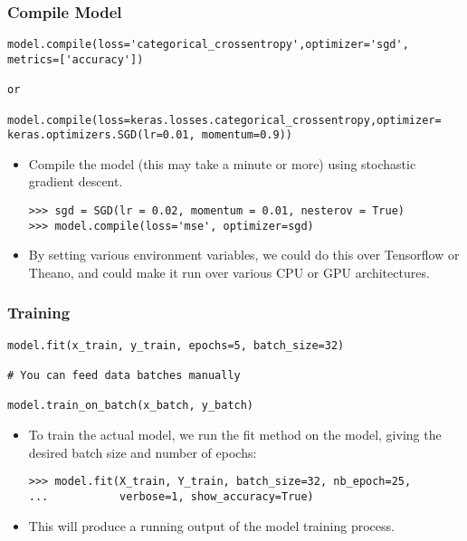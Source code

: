 \begin{frame}[fragile] \frametitle{Compile Model}
\begin{lstlisting}
model.compile(loss='categorical_crossentropy',optimizer='sgd',
metrics=['accuracy'])

or

model.compile(loss=keras.losses.categorical_crossentropy,optimizer=
keras.optimizers.SGD(lr=0.01, momentum=0.9))
\end{lstlisting}

\begin{itemize}
\item Compile the model (this may take a minute
or more) using stochastic gradient descent.
\begin{lstlisting}
>>> sgd = SGD(lr = 0.02, momentum = 0.01, nesterov = True)
>>> model.compile(loss='mse', optimizer=sgd)
\end{lstlisting}
\item By setting various environment variables, we could do this
over Tensorflow or Theano, and could make it run over
various CPU or GPU architectures.
\end{itemize}

\end{frame}

\begin{frame}[fragile] \frametitle{Training}
\begin{lstlisting}
model.fit(x_train, y_train, epochs=5, batch_size=32)

# You can feed data batches manually

model.train_on_batch(x_batch, y_batch)
\end{lstlisting}

\begin{itemize}
\item To train the actual model, we run the fit method on
the model, giving the desired batch size and number
of epochs:
\begin{lstlisting}
>>> model.fit(X_train, Y_train, batch_size=32, nb_epoch=25,
...           verbose=1, show_accuracy=True)
\end{lstlisting}
\item This will produce a running output of the model training
process.

\end{itemize}
\end{frame}


